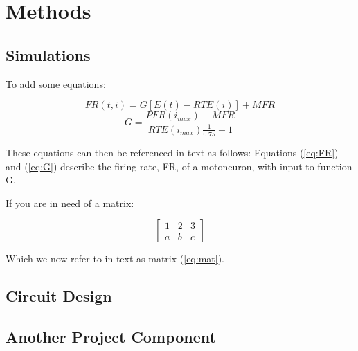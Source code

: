 \section{Methods}

\subsection{Simulations}
\lipsum[1]

\noindent To add some equations:

    \begin{equation}
        FR(t,i)=G[E(t)-RTE(i)]+MFR
        \label{eq:FR}
    \end{equation}
    \begin{equation}
        G=\frac{PFR(i_{max})-MFR}{RTE(i_{max})\frac{1}{0.75}-1}
        \label{eq:G}
    \end{equation}

\noindent These equations can then be referenced in text as follows: Equations (\ref{eq:FR}) and (\ref{eq:G}) describe the firing rate, FR, of a motoneuron, with input to function G.

\noindent If you are in need of a matrix:

    \begin{equation}
        \begin{bmatrix}
            1 & 2 & 3\\
            a & b & c
        \end{bmatrix}
        \label{eq:mat}
    \end{equation}

\noindent Which we now refer to in text as matrix (\ref{eq:mat}).

\subsection{Circuit Design}
\lipsum[1]

\subsection{Another Project Component}
\lipsum[1]